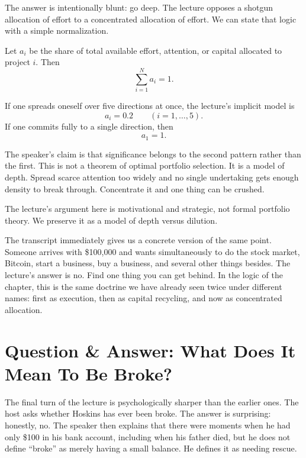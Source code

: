 The answer is intentionally blunt: go deep. The lecture opposes a shotgun allocation of effort to a concentrated allocation of effort. We can state that logic with a simple normalization.

Let \(a_i\) be the share of total available effort, attention, or capital allocated to project \(i\). Then
\begin{equation}
\sum_{i=1}^{N} a_i = 1.
\end{equation}

If one spreads oneself over five directions at once, the lecture's implicit model is
\begin{equation}
a_i = 0.2\qquad (i=1,\dots,5).
\end{equation}
If one commits fully to a single direction, then
\begin{equation}
a_1 = 1.
\end{equation}

The speaker's claim is that significance belongs to the second pattern rather than the first. This is not a theorem of optimal portfolio selection. It is a model of depth. Spread scarce attention too widely and no single undertaking gets enough density to break through. Concentrate it and one thing can be crushed.

\begin{remark}
The lecture's argument here is motivational and strategic, not formal portfolio theory. We preserve it as a model of depth versus dilution.
\end{remark}

The transcript immediately gives us a concrete version of the same point. Someone arrives with \$100{,}000 and wants simultaneously to do the stock market, Bitcoin, start a business, buy a business, and several other things besides. The lecture's answer is no. Find one thing you can get behind. In the logic of the chapter, this is the same doctrine we have already seen twice under different names: first as execution, then as capital recycling, and now as concentrated allocation.

\section{Question \& Answer: What Does It Mean To Be Broke?}

The final turn of the lecture is psychologically sharper than the earlier ones. The host asks whether Hoskins has ever been broke. The answer is surprising: honestly, no. The speaker then explains that there were moments when he had only \$100 in his bank account, including when his father died, but he does not define ``broke'' as merely having a small balance. He defines it as needing rescue.

